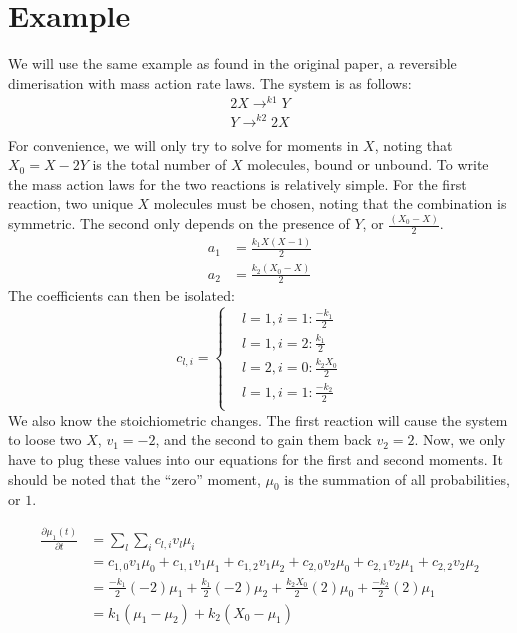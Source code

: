 \documentclass[a4paper,10pt]{article}
\begin{document}
  
 \section{Example}
 We will use the same example as found in the original paper, a reversible dimerisation with mass action rate laws. The system is as follows:
 \begin{align*}
  2X\rightarrow^{k1}Y\\
   Y\rightarrow^{k2}2X\\
 \end{align*}
 For convenience, we will only try to solve for moments in $X$, noting that $X_0= X-2Y$ is the total number of $X$ molecules, bound or unbound. To write the mass action laws for the two reactions is relatively simple. For the first reaction, two unique $X$ molecules must be chosen, noting that the combination is symmetric. The second only depends on the presence of $Y$, or $\frac{(X_0-X)}{2}$.
 \begin{align*}
   a_{1}&=\frac{k_1 X(X-1)}{2}\\
  a_{2}&=\frac{k_2 (X_0-X)}{2}
 \end{align*}
The coefficients can then be isolated:
$$ c_{l,i}=\begin{cases}
                  &l=1,i=1: \frac{-k_1}{2}\\
                  &l=1,i=2: \frac{k_1}{2}\\
                  &l=2,i=0: \frac{k_2 X_0}{2}\\
                   &l=1,i=1: \frac{-k_2}{2}\\
                 \end{cases}$$
We also know the stoichiometric changes. The first reaction will cause the system to loose two $X$, $v_1=-2$, and the second to gain them back $v_2=2$. Now, we only have to plug these values into our equations for the first and second moments. It should be noted that the ``zero'' moment, $\mu_0$ is the summation of all probabilities, or $1$.

\begin{align*}
 \frac{\partial \mu_1(t)}{\partial t}&=\sum_l \sum_i c_{l,i} v_l \mu_{i}\\
 &= c_{1,0}v_1\mu_0+c_{1,1}v_1\mu_1+c_{1,2}v_1\mu_2+c_{2,0}v_2\mu_0+c_{2,1}v_2\mu_1+c_{2,2}v_2\mu_2\\
 &= \frac{-k_1}{2}(-2)\mu_1 +\frac{k_1}{2}(-2)\mu_2+\frac{k_2 X_0}{2}(2)\mu_0+\frac{-k_2}{2}(2)\mu_1\\
 &= k_1(\mu_1-\mu_2)+k_2(X_0 - \mu_1)
\end{align*}
\end{document}
